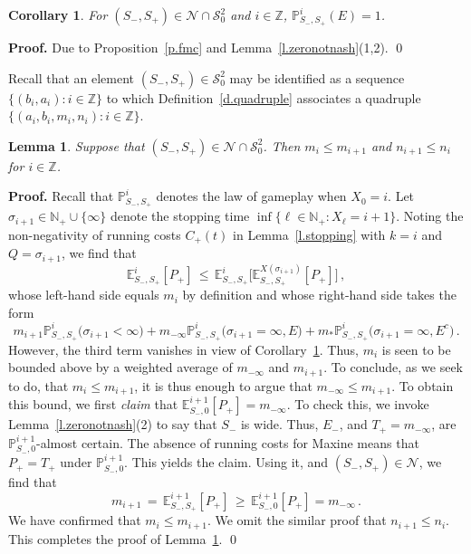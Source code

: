 \documentclass[letterpaper,11pt,oneside,reqno]{amsbook}
\newcommand{\PP}{\ensuremath{\mathbb{P}}}
\newcommand{\N}{\ensuremath{\mathbb{N}}}
\newcommand{\Z}{\ensuremath{\mathbb{Z}}}
\newcommand{\E}[0]{\mathbb{E}}
\numberwithin{figure}{chapter}
\newtheorem{lemma}[theorem]{Lemma}
\newtheorem{corollary}[theorem]{Corollary}
\theoremstyle{definition}
\theoremstyle{definition}
\theoremstyle{definition}
\theoremstyle{definition}
\theoremstyle{definition}
\newcommand{\mc}{\mathcal}
\newcommand{\nwithoutzero}{\N_+}
\newcommand{\tis}{\mc{S}_0}
\newcommand\pgameplay[3]{\PP^{#3}_{#1,#2}}
\newcommand\egameplay[3]{\E^{#3}_{#1,#2}}
\begin{document}
 
  
 \begin{corollary}\label{c.nashescape}
 For $(S_-,S_+) \in \mc{N} \cap \tis^2$ and $i \in \Z$, $\pgameplay{S_-}{S_+}{i}(E) = 1$. 
 \end{corollary}
{\bf Proof.} Due to Proposition~\ref{p.fmc} and Lemma~\ref{l.zeronotnash}(1,2). \qed

Recall that an element $(S_-,S_+) \in \tis^2$ may be identified as a sequence $\big\{ (b_i,a_i): i \in \Z \big\}$ to which Definition~\ref{d.quadruple}
associates a quadruple  $\big\{ (a_i,b_i,m_i,n_i): i \in \Z \big\}$.
\begin{lemma}\label{l.mnincdec}
Suppose that $(S_-,S_+) \in \mc{N} \cap \tis^2$. Then $m_i \leq m_{i+1}$ and $n_{i+1} \leq n_i$ for $i \in \Z$.
\end{lemma}
{\bf Proof.} Recall that 
$\pgameplay{S_-}{S_+}{i}$ 
denotes the law of gameplay when $X_0 = i$. Let $\sigma_{i+1} \in \nwithoutzero \cup \{ \infty \}$ denote the stopping time $\inf \big\{ \ell \in \nwithoutzero : X_\ell = i+1 \big\}$. 
Noting the non-negativity of running costs $C_+(t)$ in Lemma~\ref{l.stopping} with $k=i$ and $Q = \sigma_{i+1}$, we find that
$$
\egameplay{S_-}{S_+}{i} [P_+] \, \leq \,   \egameplay{S_-}{S_+}{i} \big[ \egameplay{S_-}{S_+}{X(\sigma_{i+1})}[P_+] \big] \, ,
$$
whose left-hand side equals $m_i$ by definition and whose right-hand side takes the form
$$
 m_{i+1} \pgameplay{S_-}{S_+}{i} \big( \sigma_{i+1} < \infty \big) + m_{-\infty} \pgameplay{S_-}{S_+}{i} \big( \sigma_{i+1} = \infty, E \big) 
 + m_* \pgameplay{S_-}{S_+}{i} \big( \sigma_{i+1} = \infty, E^c \big) \, .
 $$
 However, the third term vanishes in view of Corollary~\ref{c.nashescape}. Thus, $m_i$ is seen to be bounded above by a weighted average of $m_{-\infty}$ and $m_{i+1}$.
 To conclude, as we seek to do, that $m_i \leq m_{i+1}$, it is thus enough to argue that $m_{-\infty} \leq m_{i+1}$.
 To obtain this bound, we first {\em claim} that $\egameplay{S_-}{0}{i+1} [P_+] = m_{-\infty}$. To check this, we  invoke Lemma~\ref{l.zeronotnash}(2) to say that $S_-$ is wide.
  Thus, 
 $E_-$, and $T_+ = m_{-\infty}$, are $\pgameplay{S_-}{0}{i+1}$-almost certain. 
The absence of running costs for Maxine means that $P_+ = T_+$ under $\pgameplay{S_-}{0}{i+1}$. This yields the claim. Using it, and $(S_-,S_+) \in \mc{N}$, we find that
$$
 m_{i+1} \, = \, \egameplay{S_-}{S_+}{i+1}[ P_+] \, \geq \, \egameplay{S_-}{0}{i+1} [P_+] = m_{-\infty} \, .
 $$
 We have confirmed that $m_i \leq m_{i+1}$. We omit the similar proof that  $n_{i+1} \leq n_i$.  This completes the proof of Lemma~\ref{l.mnincdec}. \qed
\end{document}
